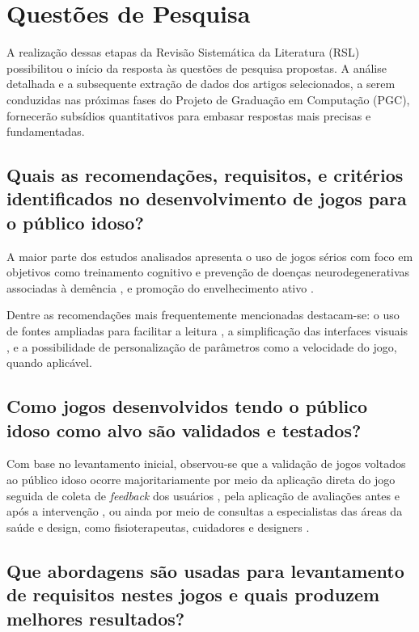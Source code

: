 \section{Questões de Pesquisa}\label{sec:qp}

A realização dessas etapas da Revisão Sistemática da Literatura (RSL) possibilitou o início da resposta às questões de pesquisa propostas. A análise detalhada e a subsequente extração de dados dos artigos selecionados, a serem conduzidas nas próximas fases do Projeto de Graduação em Computação (PGC), fornecerão subsídios quantitativos para embasar respostas mais precisas e fundamentadas.

\subsection{Quais as recomendações, requisitos, e critérios identificados no desenvolvimento de jogos para o público idoso?}\label{subsec:qp1}

A maior parte dos estudos analisados apresenta o uso de jogos sérios com foco em objetivos como treinamento cognitivo e prevenção de doenças neurodegenerativas associadas à demência \cite{yang2024serious, zuo2024development, caggianese2018towards}, e promoção do envelhecimento ativo \cite{nacimiento-garcia2024gamification}.

Dentre as recomendações mais frequentemente mencionadas destacam-se: o uso de fontes ampliadas para facilitar a leitura \cite{tziraki2017designing}, a simplificação das interfaces visuais \cite{valladares2017design}, e a possibilidade de personalização de parâmetros como a velocidade do jogo, quando aplicável.

\subsection{Como jogos desenvolvidos tendo o público idoso como alvo são validados e testados?}\label{subsec:qp2}

Com base no levantamento inicial, observou-se que a validação de jogos voltados ao público idoso ocorre majoritariamente por meio da aplicação direta do jogo seguida de coleta de \textit{feedback} dos usuários \cite{merilampi2017cognitive}, pela aplicação de avaliações antes e após a intervenção \cite{wong2022effectiveness}, ou ainda por meio de consultas a especialistas das áreas da saúde e design, como fisioterapeutas, cuidadores e designers \cite{busca2024serious}.

\subsection{Que abordagens são usadas para levantamento de requisitos nestes jogos e quais produzem melhores resultados?}\label{subsec:qp3}

